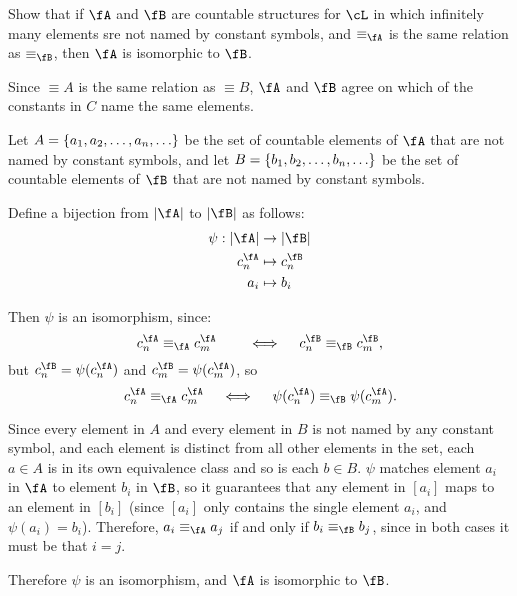 \begin{problem}
  Show that if $\fA$ and $\fB$ are countable structures for $\cL$
  in which infinitely many elements sre not named by constant symbols,
  and $\equiv_\fA$ is the same relation as $\equiv_\fB$,
  then $\fA$ is isomorphic to $\fB$.
\end{problem}
\begin{Answer}
  Since $\equiv A$ is the same relation as $\equiv B$,
  $\fA$ and $\fB$ agree on which of the constants in $C$ name the same elements.

  \step
  Let $A = \left\{a_1, a_2, \ldots, a_n, \ldots\right\}$ be the set of countable
  elements of $\fA$ that are not named by constant symbols,
  and let $B = \left\{b_1, b_2, \ldots, b_n, \ldots\right\}$ be the set of countable
  elements of $\fB$ that are not named by constant symbols.

  \step
  Define a bijection from $\abs{\fA}$ to $\abs{\fB}$ as follows:
  \begin{align*}
    \psi : \abs{\fA} &\to \abs{\fB} \\
    c_n^\fA &\mapsto c_n^\fB \\
    a_i &\mapsto b_i
  \end{align*}

  \step
  Then $\psi$ is an isomorphism, since:
  \[
    c_n^\fA \equiv_\fA c_m^\fA \quad \quad \Iff \quad c_n^\fB \equiv_\fB c_m^\fB,
  \]
  but $c_n^\fB = \psi(c_n^\fA)$ and $c_m^\fB = \psi(c_m^\fA)$,
  so
  \[
    c_n^\fA \equiv_\fA c_m^\fA \quad \Iff \quad \psi(c_n^\fA) \equiv_\fB \psi(c_m^\fA).
  \]

  \step
  Since every element in $A$ and every element in $B$
  is not named by any constant symbol, and each element is distinct from
  all other elements in the set,
  each $a \in A$ is in its own equivalence class and so is each $b \in B$.
  $\psi$ matches element $a_i$ in $\fA$ to element $b_i$ in $\fB$,
  so it guarantees that any element in $[a_i]$ maps to an element in $[b_i]$
  (since $[a_i]$ only contains the single element $a_i$, and $\psi(a_i) = b_i$).
  Therefore, $a_i \equiv_\fA a_j$ if and only if $b_i \equiv_\fB b_j$,
  since in both cases it must be that $i = j$.

  \step
  Therefore $\psi$ is an isomorphism, and $\fA$ is isomorphic to $\fB$.
\end{Answer}

